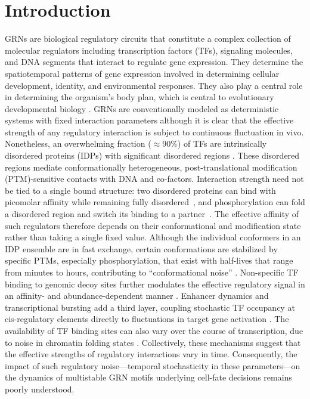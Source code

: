 \documentclass[11pt]{article}
\begin{document}
\section{Introduction}\label{sec:Intro}

GRNs are biological regulatory circuits that constitute a complex collection of molecular regulators including transcription factors (TFs), signaling molecules, and DNA segments that interact to regulate gene expression. They determine the spatiotemporal patterns of gene expression involved in determining cellular development, identity, and environmental responses. They also play a central role in determining the organism’s body plan, which is central to evolutionary developmental biology \cite{Davidson2005, Davidson2006, Maizels2026}. GRNs are conventionally modeled as deterministic systems with fixed interaction parameters although it is clear that the effective strength of any regulatory interaction is subject to continuous fluctuation in vivo. Nonetheless, an overwhelming fraction ($\approx$90\%) of TFs are intrinsically disordered proteins (IDPs) \cite{Staby2017} with significant disordered regions \cite{Ferrie2022Structure-functionRegulation, Holehouse2023TheRegions}. %
These disordered regions mediate conformationally heterogeneous, post-translational modification (PTM)-sensitive contacts with DNA and co-factors. Interaction strength need not be tied to a single bound structure: two disordered proteins can bind with picomolar affinity while remaining fully disordered~\cite{Borgia2018Extreme}, and phosphorylation can fold a disordered region and switch its binding to a partner~\cite{Bah2015Folding}. The effective affinity of such regulators therefore depends on their conformational and modification state rather than taking a single fixed value. Although the individual conformers in an IDP ensemble are in fast exchange, certain conformations are stabilized by specific PTMs, especially phosphorylation, that exist with half-lives that range from minutes to hours, contributing to ``conformational noise'' \cite{Kulkarni2022, Kulkarni2019}. Non-specific TF binding to genomic decoy sites further modulates the effective regulatory signal in an affinity- and abundance-dependent manner \cite{Dey2020EnhancementSites, Burger2012InfluenceExpression}. Enhancer dynamics and transcriptional bursting add a third layer, coupling stochastic TF occupancy at cis-regulatory elements directly to fluctuations in target gene activation \cite{Raj2006StochasticCells, Fukaya2016EnhancerBursting}. The availability of TF binding sites can also vary over the course of transcription, due to noise in chromatin folding states \cite{Gamble2025}. Collectively, these mechanisms suggest that the effective strengths of regulatory interactions vary in time. Consequently, the impact of such regulatory noise—temporal stochasticity in these parameters—on the dynamics of multistable GRN motifs underlying cell-fate decisions remains poorly understood.
\end{document}

